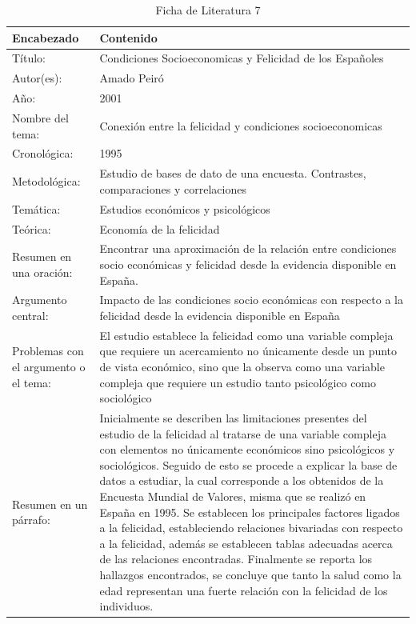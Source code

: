 \begin{table}[H]
    \caption{Ficha de Literatura 7}
    \begin{center}
        \begin{tabular}{  m{3cm} | m{12cm}  }
        \hline\textbf{ Encabezado} & \textbf{Contenido }\\ \hline
        Título: &  Condiciones Socioeconomicas y
        Felicidad de los Españoles
        \\ \hline
        Autor(es): & Amado Peiró \\ \hline
        Año: &  2001\\ \hline
        Nombre del tema: & Conexión entre la felicidad y condiciones socioeconomicas \\ \hline
        Cronológica: & 1995 \\ \hline
        Metodológica: & Estudio de bases de dato de una encuesta. Contrastes, comparaciones y correlaciones  \\ \hline
        Temática: & Estudios económicos y psicológicos\\ \hline
        Teórica:  & Economía de la felicidad \\ \hline
        Resumen en una oración: & Encontrar una aproximación de la relación entre condiciones socio económicas y felicidad desde la evidencia disponible en España. \\ \hline
        Argumento central: & Impacto de las condiciones socio económicas con respecto a la felicidad desde la evidencia disponible en España\\ \hline
        Problemas con el argumento o el tema: & El estudio establece la felicidad como una variable compleja que requiere un acercamiento no únicamente desde un punto de vista económico, sino que la observa como una variable compleja que requiere un estudio tanto psicológico como sociológico  \\ \hline
        Resumen en un párrafo: & Inicialmente se describen las limitaciones presentes del estudio de la felicidad al tratarse de una variable compleja con elementos no únicamente económicos sino psicológicos y sociológicos. Seguido de esto se procede a explicar la base de datos a estudiar, la cual corresponde a los obtenidos de la Encuesta Mundial de Valores, misma que se realizó en España en 1995. Se establecen los principales factores ligados a la felicidad, estableciendo relaciones bivariadas con respecto a la felicidad, además se establecen tablas adecuadas acerca de las relaciones encontradas. Finalmente se reporta los hallazgos encontrados, se concluye que tanto la salud como la edad representan una fuerte relación con la felicidad de los individuos. \\ \hline
        \end{tabular}
    \end{center}
\end{table}

